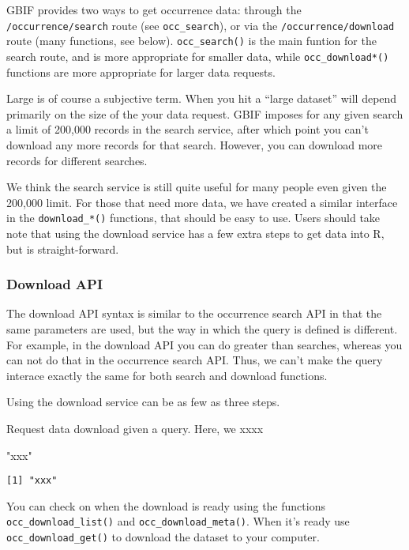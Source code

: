\documentclass[author-year, review, 11pt]{components/elsarticle} %
\newenvironment{Shaded}{\begin{snugshade}}{\end{snugshade}}
\newcommand{\StringTok}[1]{\textcolor[rgb]{0.31,0.60,0.02}{{#1}}}
\begin{document}
GBIF provides two ways to get occurrence data: through the
\texttt{/occurrence/search} route (see \texttt{occ\_search}), or via the
\texttt{/occurrence/download} route (many functions, see below).
\texttt{occ\_search()} is the main funtion for the search route, and is
more appropriate for smaller data, while \texttt{occ\_download*()}
functions are more appropriate for larger data requests.

Large is of course a subjective term. When you hit a ``large dataset''
will depend primarily on the size of the your data request. GBIF imposes
for any given search a limit of 200,000 records in the search service,
after which point you can't download any more records for that search.
However, you can download more records for different searches.

We think the search service is still quite useful for many people even
given the 200,000 limit. For those that need more data, we have created
a similar interface in the \texttt{download\_*()} functions, that should
be easy to use. Users should take note that using the download service
has a few extra steps to get data into R, but is straight-forward.

\subsubsection{Download API}\label{download-api}

The download API syntax is similar to the occurrence search API in that
the same parameters are used, but the way in which the query is defined
is different. For example, in the download API you can do greater than
searches, whereas you can not do that in the occurrence search API.
Thus, we can't make the query interace exactly the same for both search
and download functions.

Using the download service can be as few as three steps.

Request data download given a query. Here, we xxxx

\begin{Shaded}
\begin{Highlighting}[]
\StringTok{"xxx"}
\end{Highlighting}
\end{Shaded}

\begin{verbatim}
[1] "xxx"
\end{verbatim}

You can check on when the download is ready using the functions
\texttt{occ\_download\_list()} and \texttt{occ\_download\_meta()}. When
it's ready use \texttt{occ\_download\_get()} to download the dataset to
your computer.
\end{document}
